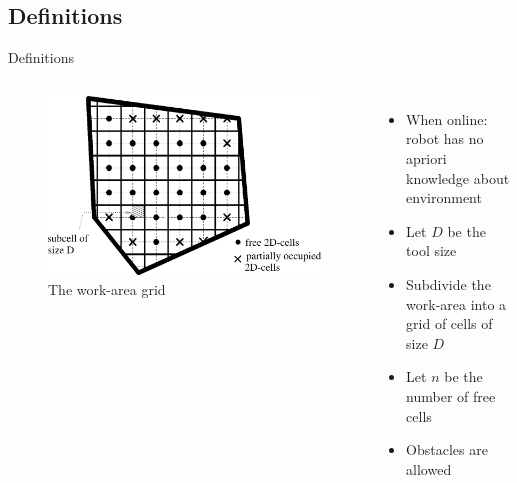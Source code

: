 \documentclass{beamer}
\begin{document}
\subsection{Definitions}
\begin{frame}{Definitions}
    \begin{columns}
        \begin{figure}
            \includegraphics[width=0.8\linewidth]{Images/inv_fig1.png}
            \caption{The work-area grid}
        \end{figure}
        \begin{itemize}
            \item When online: robot has no apriori knowledge about environment
            \item Let $D$ be the tool size
            \item Subdivide the work-area into a grid of cells of size $D$
            \item Let $n$ be the number of free cells
            \item Obstacles are allowed
        \end{itemize}
    \end{columns}
\end{frame}
\end{document}
